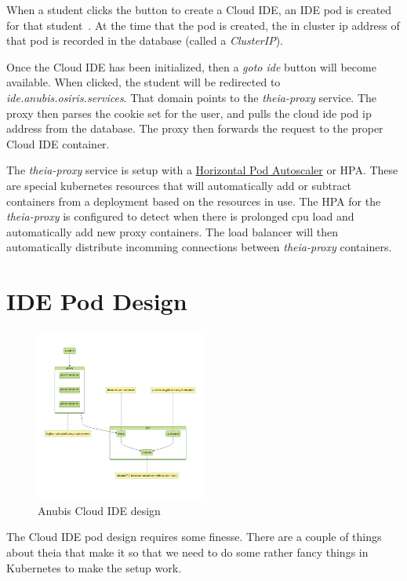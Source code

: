 When a student clicks the button to create a Cloud IDE, 
an IDE pod is created for that student~.
At the time that the pod is created, the in cluster ip address
of that pod is recorded in the database (called a \textit{ClusterIP}).

Once the Cloud IDE has been initialized, then a \textit{goto ide} button
will become available.
When clicked, the student will be redirected to \textit{ide.anubis.osiris.services}.
That domain points to the \textit{theia-proxy} service.
The proxy then parses the cookie set for the user, and pulls the 
cloud ide pod ip address from the database.
The proxy then forwards the request to the proper Cloud IDE container.

The \textit{theia-proxy} service is setup with a 
\href{https://kubernetes.io/docs/tasks/run-application/horizontal-pod-autoscale/}{Horizontal Pod Autoscaler} or HPA.
These are special kubernetes resources that will automatically add or subtract containers
from a deployment based on the resources in use.
The HPA for the \textit{theia-proxy} is configured to detect when 
there is prolonged cpu load and automatically add new proxy containers.
The load balancer will then automatically distribute incomming connections
between \textit{theia-proxy} containers.


\section{IDE Pod Design}\label{sec:ide-pod-design}

\begin{figure}[ht]
    \centering
    \includegraphics[width=0.5\textwidth]{figures/theia-pod.mmd}
    \caption{Anubis Cloud IDE design\label{fig:anubis-ide}}
\end{figure}

The Cloud IDE pod design requires some finesse. 
There are a couple of things about theia that make it so that
we need to do some rather fancy things in Kubernetes to make 
the setup work.

